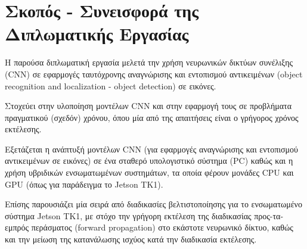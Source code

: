 \section{Σκοπός - Συνεισφορά της Διπλωματικής Εργασίας}
\label{section:contribution}

Η παρούσα διπλωματική εργασία μελετά την χρήση νευρωνικών δικτύων συνέλιξης (CNN)
σε εφαρμογές ταυτόχρονης αναγνώρισης και εντοπισμού αντικειμένων
(object recognition and localization - object detection) σε εικόνες.

Στοχεύει στην υλοποίηση μοντέλων CNN και στην εφαρμογή τους σε προβλήματα πραγματικού (σχεδόν)
χρόνου, όπου μία από της απαιτήσεις είναι ο γρήγορος χρόνος εκτέλεσης.

Εξετάζεται η ανάπτυξή μοντέλων CNN (για εφαρμογές αναγνώρισης και εντοπισμού αντικειμένων σε εικόνες)
σε ένα σταθερό υπολογιστικό σύστημα (PC)
καθώς και η χρήση υβριδικών ενσωματωμένων συστημάτων, τα οποία
φέρουν μονάδες CPU και GPU (όπως για παράδειγμα το Jetson TK1).

Επίσης παρουσιάζει μία σειρά από διαδικασίες βελτιστοποίησης για το
ενσωματωμένο σύστημα Jetson TK1, με στόχο την γρήγορη εκτέλεση
της διαδικασίας προς-τα-εμπρός περάσματος (forward propagation) στο εκάστοτε νευρωνικό δίκτυο,
καθώς και την μείωση της κατανάλωσης ισχύος κατά την διαδικασία εκτέλεσης.

